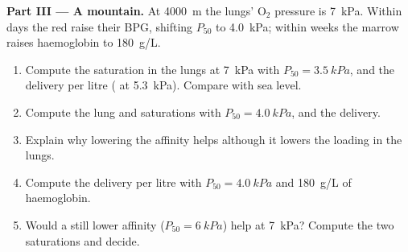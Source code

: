 \begin{problem}
\medskip
\noindent\textbf{Part III --- A mountain.}
At \qty{4000}{m} the lungs' $\mathrm{O_2}$ pressure is \qty{7}{kPa}.
Within days the red  raise their BPG, shifting $P_{50}$ to
\qty{4.0}{kPa}; within weeks the marrow raises haemoglobin to
\qty{180}{g/L}.
\begin{enumerate}[resume]
  \item Compute the saturation in the lungs at \qty{7}{kPa} with
        $P_{50} = \qty{3.5}{kPa}$, and the delivery per litre (
        at \qty{5.3}{kPa}). Compare with sea level.
  \item Compute the lung and  saturations with
        $P_{50} = \qty{4.0}{kPa}$, and the delivery.
  \item Explain why lowering the affinity helps although it lowers
        the loading in the lungs.
  \item Compute the delivery per litre with $P_{50} = \qty{4.0}{kPa}$
        and \qty{180}{g/L} of haemoglobin.
  \item Would a still lower affinity ($P_{50} = \qty{6}{kPa}$) help at
        \qty{7}{kPa}? Compute the two saturations and decide.
\end{enumerate}


\end{problem}
